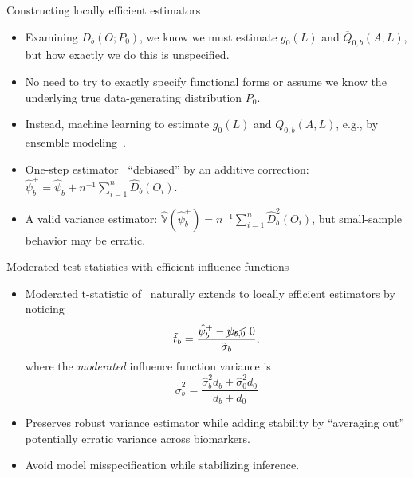 \documentclass{beamer}
\begin{document}
\begin{frame}[c]{Constructing locally efficient estimators}

\begin{center}
\begin{itemize}
  \itemsep6pt
  \item Examining $D_b(O; P_0)$, we know we must estimate $g_0(L)$ and
    $\overline{Q}_{0,b}(A,L)$, but how exactly we do this is unspecified.
  \item No need to try to exactly specify functional forms or assume we know the
    underlying true data-generating distribution $P_0$.
  \item Instead, machine learning to estimate $g_0(L)$ and
    $\overline{Q}_{0,b}(A,L)$, e.g., by ensemble
    modeling~\citep{vdl2007super}.
  \item One-step estimator~\citep{bickel1993efficient} ``debiased'' by an
     additive correction: $\hat{\psi}_{b}^{+} = \hat{\psi}_{b} + n^{-1}
     \sum_{i=1}^n \hat{D}_b(O_i)$.
  \item A valid variance estimator: $\hat{\mathbb{V}}(\hat{\psi}_b^{+}) =
    n^{-1} \sum_{i=1}^n \hat{D}_b^2(O_i)$, but small-sample behavior may be
    erratic.
\end{itemize}
\end{center}

\end{frame}


\begin{frame}[c]{Moderated test statistics with efficient influence functions}

\begin{center}
\begin{itemize}
  \itemsep6pt
  \item Moderated t-statistic of~\cite{smyth2004linear} naturally extends to
    locally efficient estimators by noticing
    \begin{equation*}
      \tilde{t}_b = \frac{\hat{\psi}_b^{+} - \cancel{\psi_{b,0}}{~0}}
      {\tilde{\sigma}_b},
    \end{equation*}
    where the \textit{moderated} influence function variance is
    \begin{equation*}
      \tilde{\sigma}^2_b = \frac{\hat{\sigma}^2_b d_b + \hat{\sigma}^2_0 d_0}
      {d_b + d_0}
    \end{equation*}
  \item Preserves robust variance estimator while adding stability by
    ``averaging out'' potentially erratic variance across biomarkers.
  \item Avoid model misspecification while stabilizing inference.
\end{itemize}
\end{center}

\note{
}
\end{frame}
\end{document}
